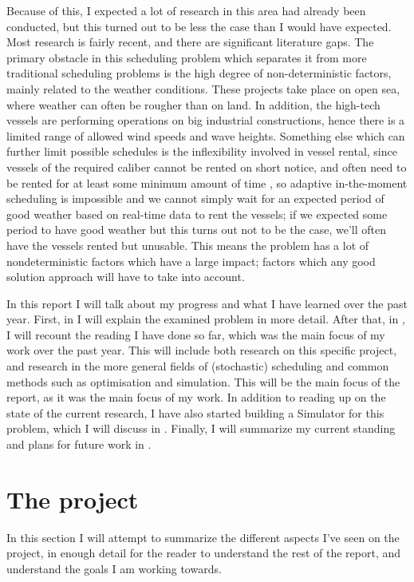 \documentclass[a4paper,12pt]{article}
\begin{document}
Because of this, I expected a lot of research in this area had already been conducted, but this turned out to be less the case than I would have expected. Most research is fairly recent, and there are significant literature gaps. The primary obstacle in this scheduling problem which separates it from more traditional scheduling problems is the high degree of non-deterministic factors, mainly related to the weather conditions. These projects take place on open sea, where weather can often be rougher than on land. In addition, the high-tech vessels are performing operations on big industrial constructions, hence there is a limited range of allowed wind speeds and wave heights. Something else which can further limit possible schedules is the inflexibility involved in vessel rental, since vessels of the required caliber cannot be rented on short notice, and often need to be rented for at least some minimum amount of time \cite{kerkhove2017optimised}, so adaptive in-the-moment scheduling is impossible and we cannot simply wait for an expected period of good weather based on real-time data to rent the vessels; if we expected some period to have good weather but this turns out not to be the case, we'll often have the vessels rented but unusable. This means the problem has a lot of nondeterministic factors which have a large impact; factors which any good solution approach will have to take into account. 

In this report I will talk about my progress and what I have learned over the past year. First, in  I will explain the examined problem in more detail. After that, in , I will recount the reading I have done so far, which was the main focus of my work over the past year. This will include both research on this specific project, and research in the more general fields of (stochastic) scheduling and common methods such as optimisation and simulation. This will be the main focus of the report, as it was the main focus of my work. In addition to reading up on the state of the current research, I have also started building a Simulator for this problem, which I will discuss in . Finally, I will summarize my current standing and plans for future work in . 

\pagebreak

\section{The project} \label{s:project}
In this section I will attempt to summarize the different aspects I've seen on the project, in enough detail for the reader to understand the rest of the report, and understand the goals I am working towards.
\end{document}
